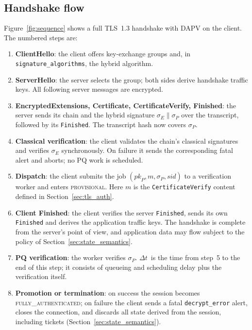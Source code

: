 \documentclass[preprint,10pt,3p]{elsarticle}
\newcommand{\Dt}{\ensuremath{\Delta t}}
\newcommand{\state}[1]{\textsc{#1}}
\begin{document}
\subsection{Handshake flow}
\label{sec:flow}

Figure~\ref{fig:sequence} shows a full TLS~1.3 handshake with DAPV on the
client.  The numbered steps are:
\begin{enumerate}[leftmargin=*,noitemsep]
\item \textbf{ClientHello}: the client offers key-exchange groups and, in
  \texttt{signature\_algorithms}, the hybrid algorithm.
\item \textbf{ServerHello}: the server selects the group; both sides derive
  handshake traffic keys.  All following server messages are encrypted.
\item \textbf{EncryptedExtensions, Certificate, CertificateVerify,
  Finished}: the server sends its chain and the hybrid signature
  $\sigma_E\|\sigma_P$ over the transcript, followed by its
  \texttt{Finished}.  The transcript hash now covers $\sigma_P$.
\item \textbf{Classical verification}: the client validates the chain's
  classical signatures and verifies $\sigma_E$ synchronously.  On failure it
  sends the corresponding fatal alert and aborts; no PQ work is scheduled.
\item \textbf{Dispatch}: the client submits the job
  $(\mathit{pk}_P, m, \sigma_P, \mathit{sid})$ to a verification worker and
  enters \state{provisional}.  Here $m$ is the \texttt{CertificateVerify}
  content defined in Section~\ref{sec:tls_auth}.
\item \textbf{Client Finished}: the client verifies the server
  \texttt{Finished}, sends its own \texttt{Finished} and derives the
  application traffic keys.  The handshake is complete from the server's
  point of view, and application data may flow subject to the policy of
  Section~\ref{sec:state_semantics}.
\item \textbf{PQ verification}: the worker verifies $\sigma_P$.  \Dt\ is the
  time from step~5 to the end of this step; it consists of queueing and
  scheduling delay plus the verification itself.
\item \textbf{Promotion or termination}: on success the session becomes
  \state{fully\_authenticated}; on failure the client sends a fatal
  \texttt{decrypt\_error} alert, closes the connection, and discards all
  state derived from the session, including tickets
  (Section~\ref{sec:state_semantics}).
\end{enumerate}
\end{document}
